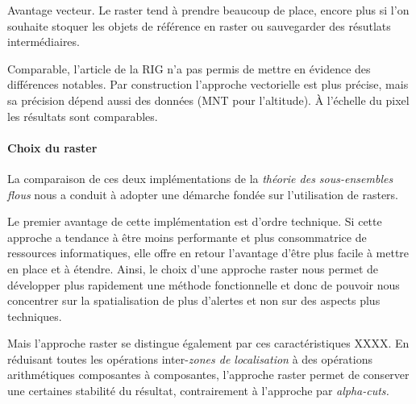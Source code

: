 
Avantage vecteur. Le raster tend à prendre beaucoup de place, encore
plus si l'on souhaite stoquer les objets de référence en raster ou
sauvegarder des résutlats intermédiaires.


Comparable, l'article de la RIG n'a pas permis de mettre en évidence
des différences notables. Par construction l'approche vectorielle est
plus précise, mais sa précision dépend aussi des données (MNT pour
l'altitude). À l'échelle du pixel les résultats sont comparables.



\paragraph{Choix du raster}


La comparaison de ces deux implémentations de la \emph{théorie des
  sous-ensembles flous} nous a conduit à adopter une démarche fondée sur
l'utilisation de rasters.




Le premier avantage de cette implémentation est d'ordre technique. Si
cette approche a tendance à être moins performante et plus
consommatrice de ressources informatiques, elle offre en retour
l'avantage d'être plus facile à mettre en place et à étendre. Ainsi,
le choix d'une approche raster nous permet de développer plus
rapidement une méthode fonctionnelle et donc de pouvoir nous
concentrer sur la spatialisation de plus d'alertes et non sur des
aspects plus techniques.


Mais l'approche raster se distingue également par ces caractéristiques
XXXX. En réduisant toutes les opérations inter-\emph{zones de
  localisation} à des opérations arithmétiques composantes à
composantes, l'approche raster permet de conserver une certaines
stabilité du résultat, contrairement à l'approche par
\emph{alpha-cuts.}


